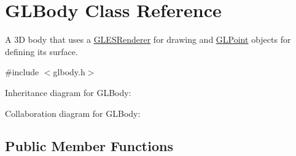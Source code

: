 \hypertarget{class_g_l_body}{}\section{G\+L\+Body Class Reference}
\label{class_g_l_body}


A 3D body that uses a \mbox{\hyperlink{class_g_l_e_s_renderer}{G\+L\+E\+S\+Renderer}} for drawing and \mbox{\hyperlink{class_g_l_point}{G\+L\+Point}} objects for defining its surface.  




{\ttfamily \#include $<$glbody.\+h$>$}



Inheritance diagram for G\+L\+Body\+:


Collaboration diagram for G\+L\+Body\+:
\subsection*{Public Member Functions}
